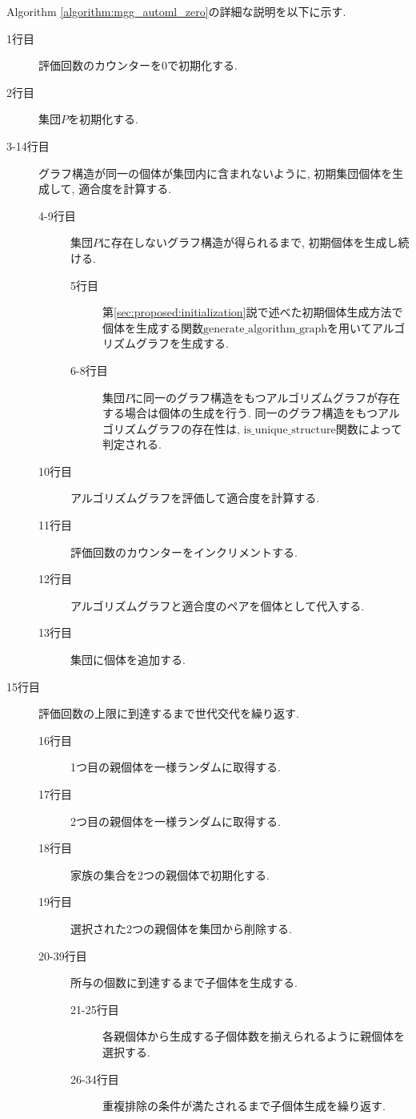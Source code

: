 \documentclass[11pt,oneside,openany,report]{jsbook}
\begin{document}
Algorithm \ref{algorithm:mgg_automl_zero}の詳細な説明を以下に示す.

\begin{description}
  \item[1行目] 評価回数のカウンターを0で初期化する.
  \item[2行目] 集団$P$を初期化する.
  \item[3-14行目] グラフ構造が同一の個体が集団内に含まれないように, 初期集団個体を生成して, 適合度を計算する.
  \begin{description}
    \item[4-9行目] 集団$P$に存在しないグラフ構造が得られるまで, 初期個体を生成し続ける.
    \begin{description}
      \item[5行目] 第\ref{sec:proposed:initialization}説で述べた初期個体生成方法で個体を生成する関数$\mathrm{generate\_algorithm\_graph}$を用いてアルゴリズムグラフを生成する.
      \item[6-8行目] 集団$P$に同一のグラフ構造をもつアルゴリズムグラフが存在する場合は個体の生成を行う. 同一のグラフ構造をもつアルゴリズムグラフの存在性は, $\mathrm{is\_unique\_structure}$関数によって判定される.
    \end{description}
    \item[10行目] アルゴリズムグラフを評価して適合度を計算する.
    \item[11行目] 評価回数のカウンターをインクリメントする.
    \item[12行目] アルゴリズムグラフと適合度のペアを個体として代入する.
    \item[13行目] 集団に個体を追加する.
  \end{description}
  \item[15行目] 評価回数の上限に到達するまで世代交代を繰り返す.
  \begin{description}
    \item[16行目] 1つ目の親個体を一様ランダムに取得する.
    \item[17行目] 2つ目の親個体を一様ランダムに取得する.
    \item[18行目] 家族の集合を2つの親個体で初期化する.
    \item[19行目] 選択された2つの親個体を集団から削除する.
    \item[20-39行目] 所与の個数に到達するまで子個体を生成する.
    \begin{description}
      \item[21-25行目] 各親個体から生成する子個体数を揃えられるように親個体を選択する.
      \item[26-34行目] 重複排除の条件が満たされるまで子個体生成を繰り返す.

\end{description}
\end{description}
\end{description}
\end{document}
